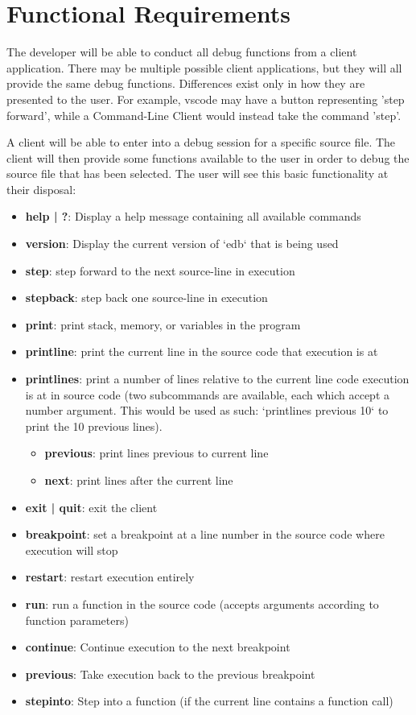 \documentclass{report}
\begin{document}
\section{Functional Requirements}
The developer will be able to conduct all debug functions from a client application. There may be multiple possible client applications, but they will all provide the same debug functions. Differences exist only in how they are presented to the user. For example, \gls{vscode} may have a button representing 'step forward', while a Command-Line Client would instead take the command 'step'. 

A client will be able to enter into a debug session for a specific source file. The client will then provide some functions available to the user in order to debug the source file that has been selected. The user will see this basic functionality at their disposal:
\begin{itemize}
	\item \textbf{help | ?}: Display a help message containing all available commands
	\item \textbf{version}: Display the current version of `edb` that is being used
	\item \textbf{step}: step forward to the next source-line in execution
	\item \textbf{stepback}: step back one source-line in execution
	\item \textbf{print}: print stack, memory, or variables in the program
	\item \textbf{printline}: print the current line in the source code that execution is at
	\item \textbf{printlines}: print a number of lines relative to the current line code execution is at in source code (two subcommands are available, each which accept a number argument. This would be used as such: `printlines previous 10` to print the 10 previous lines).
	\begin{itemize}
		\item \textbf{previous}: print lines previous to current line
		\item \textbf{next}: print lines after the current line
	\end{itemize}
	\item \textbf{exit | quit}: exit the client
	\item \textbf{breakpoint}: set a breakpoint at a line number in the source code where execution will stop
	\item \textbf{restart}: restart execution entirely
	\item \textbf{run}: run a function in the source code (accepts arguments according to function parameters)
	\item \textbf{continue}: Continue execution to the next breakpoint
	\item \textbf{previous}: Take execution back to the previous breakpoint
	\item \textbf{stepinto}: Step into a function (if the current line contains a function call)
\end{itemize}
\end{document}
